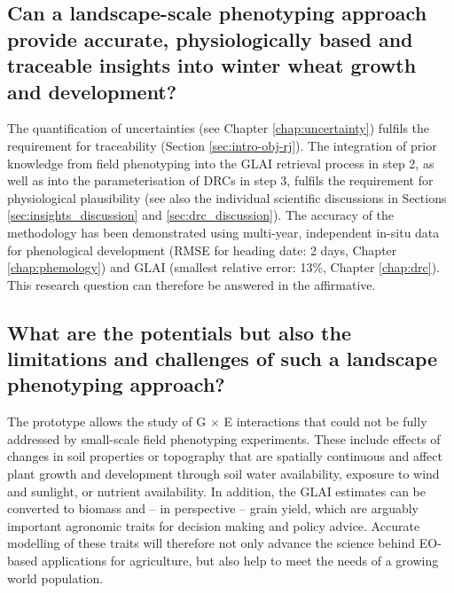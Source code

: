 \subsection{Can a landscape-scale phenotyping approach provide accurate, physiologically based and traceable insights into winter wheat growth and development?}
The quantification of uncertainties (see Chapter \ref{chap:uncertainty}) fulfils the requirement for traceability (Section \ref{sec:intro-obj-rj}). The integration of prior knowledge from field phenotyping into the \gls{GLAI} retrieval process in step 2, as well as into the parameterisation of \gls{DRC}s in step 3, fulfils the requirement for physiological plausibility (see also the individual scientific discussions in Sections \ref{sec:insights_discussion} and \ref{sec:drc_discussion}). The accuracy of the methodology has been demonstrated using multi-year, independent in-situ data for phenological development (RMSE for heading date: 2 days, Chapter \ref{chap:phemology}) and GLAI (smallest relative error: 13\%, Chapter \ref{chap:drc}). This research question can therefore be answered in the affirmative.

\subsection{What are the potentials but also the limitations and challenges of such a landscape phenotyping approach?}

The prototype allows the study of G $\times$ E interactions that could not be fully addressed by small-scale field phenotyping experiments. These include effects of changes in soil properties or topography that are spatially continuous and affect plant growth and development through soil water availability, exposure to wind and sunlight, or nutrient availability. In addition, the \gls{GLAI} estimates can be converted to biomass \citep{aase_relationship_1978} and -- in perspective -- grain yield, which are arguably important agronomic traits for decision making and policy advice. Accurate modelling of these traits will therefore not only advance the science behind \gls{EO}-based applications for agriculture, but also help to meet the needs of a growing world population.



